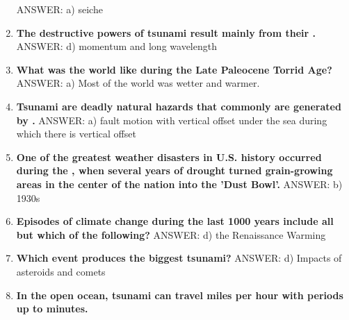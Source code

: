 \documentclass[10pt]{article}
\newcommand{\Rivpt}{\rule{.1pt}{1pt}}
\begin{document}
\begin{enumerate}
{\begin{samepage}
{}
ANSWER: a)	seiche
\end{samepage}
}
\item {
\setlength{\itemsep}{0cm}
\setlength{\parskip}{.2cm}
\begin{samepage}
\textbf{
The destructive powers of tsunami result mainly from their \makebox[1cm]{\Rivpt\hrulefill\Rivpt}.
}
ANSWER: d)	momentum and long wavelength
\end{samepage}
}
\item {
\setlength{\itemsep}{0cm}
\setlength{\parskip}{.2cm}
\begin{samepage}
\textbf{
What was the world like during the Late Paleocene Torrid Age? 
}
ANSWER: a) Most of the world was wetter and warmer.
\end{samepage}
}
\item {
\setlength{\itemsep}{0cm}
\setlength{\parskip}{.2cm}
\begin{samepage}
\textbf{
Tsunami are deadly natural hazards that commonly are generated by \makebox[1cm]{\Rivpt\hrulefill\Rivpt}.
}
ANSWER: a)	fault motion with vertical offset under the sea during which there is vertical offset
\end{samepage}
}
\item {
\setlength{\itemsep}{0cm}
\setlength{\parskip}{.2cm}
\begin{samepage}
\textbf{
One of the greatest weather disasters in U.S. history occurred during the \makebox[1cm]{\Rivpt\hrulefill\Rivpt}, when several years of drought turned grain-growing areas in the center of the nation into the 'Dust Bowl'. 
}
ANSWER: b) 1930s
\end{samepage}
}
\item {
\setlength{\itemsep}{0cm}
\setlength{\parskip}{.2cm}
\begin{samepage}
\textbf{
Episodes of climate change during the last 1000 years include all but which of the following?
}
ANSWER: d) the Renaissance Warming
\end{samepage}
}
\item {
\setlength{\itemsep}{0cm}
\setlength{\parskip}{.2cm}
\begin{samepage}
\textbf{
Which event produces the biggest tsunami?
}
ANSWER: d)	Impacts of asteroids and comets
\end{samepage}
}
\item {
\setlength{\itemsep}{0cm}
\setlength{\parskip}{.2cm}
\begin{samepage}
\textbf{
In the open ocean, tsunami can travel \makebox[1cm]{\Rivpt\hrulefill\Rivpt} miles per hour with periods up to \makebox[1cm]{\Rivpt\hrulefill\Rivpt} minutes.
}
\end{samepage}}
\end{enumerate}
\end{document}
